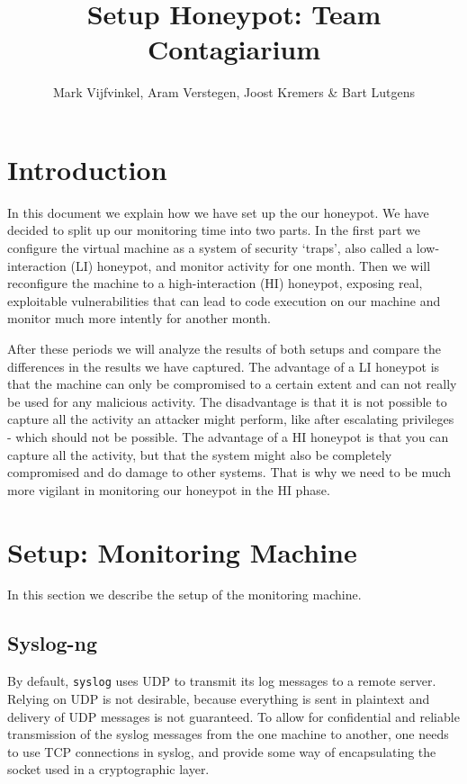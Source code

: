 \documentclass[11pt]{article} %
\title{Setup Honeypot: Team Contagiarium}
\author{Mark Vijfvinkel, Aram Verstegen, Joost Kremers \& Bart Lutgens}
\begin{document}
\maketitle

\section{Introduction}

In this document we explain how we have set up the our honeypot. 
We have decided to split up our monitoring time into two parts.
In the first part we configure the virtual machine as a system of security `traps', also called a low-interaction (LI) honeypot, and monitor activity for one month.
Then we will reconfigure the machine to a high-interaction (HI) honeypot, exposing real, exploitable vulnerabilities that can lead to code execution on our machine and monitor much more intently for another month. 

After these periods we will analyze the results of both setups and compare the differences in the results we have captured. 
The advantage of a LI honeypot is that the machine can only be compromised to a certain extent and can not really be used for any malicious activity.
The disadvantage is that it is not possible to capture all the activity an attacker might perform, like after escalating privileges - which should not be possible.
The advantage of a HI honeypot is that you can capture all the activity, but that the system might also be completely compromised and do damage to other systems.
That is why we need to be much more vigilant in monitoring our honeypot in the HI phase.

\section{Setup: Monitoring Machine}

In this section we describe the setup of the monitoring machine.

\subsection{Syslog-ng}
By default, \verb|syslog| uses UDP to transmit its log messages to a remote server.
Relying on UDP is not desirable, because everything is sent in plaintext and delivery of UDP messages is not guaranteed.
To allow for confidential and reliable transmission of the syslog messages from the one machine to another, one needs to use TCP connections in syslog, and provide some way of encapsulating the socket used in a cryptographic layer.
\end{document}
